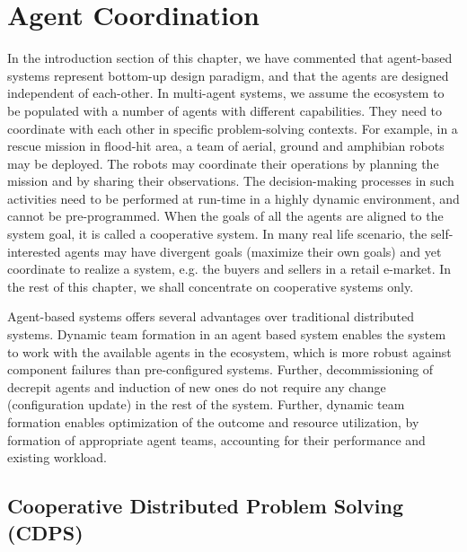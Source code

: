 \section{Agent Coordination}

  
In the introduction section of this chapter, we have commented that agent-based systems represent bottom-up design paradigm, and 
that the agents are designed independent of each-other. In multi-agent systems, we assume the ecosystem to be populated with a number 
of agents with different capabilities. They need to coordinate with each other in specific problem-solving contexts. For example, in 
a rescue mission in flood-hit area, a team of aerial, ground and amphibian robots may be deployed. The robots may coordinate their
operations by planning the mission and by sharing their observations. The decision-making processes in such activities need to be 
performed at run-time in a highly dynamic environment, and cannot be pre-programmed. When the goals of all the agents are aligned 
to the system goal, it is called a cooperative system.  In many real life scenario, the self-interested agents may have divergent 
goals (maximize their own goals) and yet coordinate to realize a system, e.g. the buyers and sellers in a retail e-market. 
In the rest of this chapter, we shall concentrate on cooperative systems only. 

Agent-based systems offers several advantages over traditional distributed systems. Dynamic team formation in an agent based system 
enables the system to work with the available agents in the ecosystem, which is more robust against component failures than 
pre-configured systems. Further, decommissioning of decrepit agents and induction of new ones do not require any change (configuration 
update) in the rest of the system. Further, dynamic team formation enables optimization of the outcome and resource utilization, by 
formation of appropriate agent teams, accounting for their performance and existing workload.

\subsection{Cooperative Distributed Problem Solving (CDPS)}
 
